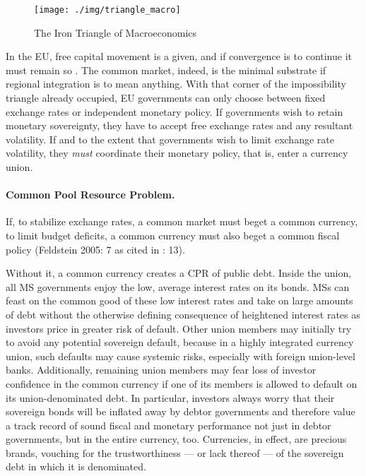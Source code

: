 \documentclass[11pt,a4paper,oneside,openright]{article}
\begin{document}
 \begin{figure}[htbp]
	\centering
	\texttt{[image: ./img/triangle\_macro]}  
	\caption{The Iron Triangle of Macroeconomics}
	\label{fig:triangle_macro}
\end{figure} 

In the \gls{EU}, free capital movement is a given, and if convergence is to continue it must remain so \citep{Abiad2007}. 
The common market, indeed, is the minimal substrate if regional integration is to mean anything. 
With that corner of the impossibility triangle already occupied, \gls{EU} governments can only choose between fixed exchange rates or independent monetary policy. 
If governments wish to retain monetary sovereignty, they have to accept free exchange rates and any resultant volatility. 
If and to the extent that governments wish to limit exchange rate volatility, they \emph{must} coordinate their monetary policy, that is, enter a currency union.

\paragraph[Fiscal-CPR]{Common Pool Resource Problem.}  \label{sec:Fiscal-CPR} If, to stabilize exchange rates, a common market must beget a common currency, to limit budget deficits, a common currency must also beget a common fiscal policy (Feldstein 2005: 7 as cited in \citealt{Begg2008}: 13). 

Without it, a common currency creates a \gls{CPR} of public debt. 
Inside the union, all \gls{MS} governments enjoy the low, average interest rates on its bonds. 
\glspl{MS} can feast on the common good of these low interest rates and take on large amounts of debt without the otherwise defining consequence of heightened interest rates as investors price in greater risk of default. %
Other union members may initially try to avoid any potential sovereign default, because in a highly integrated currency union, such defaults may cause systemic risks, especially with foreign union-level banks. 
Additionally, remaining union members may fear loss of investor confidence in the common currency if one of its members is allowed to default on its union-denominated debt. 
In particular, investors always worry that their sovereign bonds will be inflated away by debtor governments and therefore value a track record of sound fiscal and monetary performance not just in debtor governments, but in the entire currency, too. 
Currencies, in effect, are precious brands, vouching for the trustworthiness --- or lack thereof --- of the sovereign debt in which it is denominated.
\end{document}
